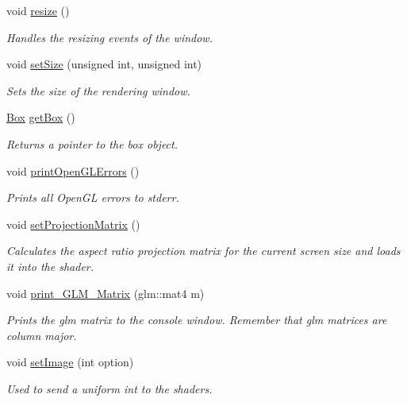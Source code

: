 \begin{DoxyCompactItemize}
void \hyperlink{class_graphics_engine_a6a38e40ee4227a8b53dddf07f92323ee}{resize} ()
\begin{DoxyCompactList}\small\item\em Handles the resizing events of the window. \end{DoxyCompactList}\item 
void \hyperlink{class_graphics_engine_aac1a9cc3d195ed1f28018dffd80dae41}{set\+Size} (unsigned int, unsigned int)
\begin{DoxyCompactList}\small\item\em Sets the size of the rendering window. \end{DoxyCompactList}\item 
\mbox{\label{class_graphics_engine_ad54e730c88430d0650dc695d08a33712}} 
\hyperlink{class_box}{Box} \hyperlink{class_graphics_engine_ad54e730c88430d0650dc695d08a33712}{get\+Box} ()
\begin{DoxyCompactList}\small\item\em Returns a pointer to the box object. \end{DoxyCompactList}\item 
\mbox{\label{class_graphics_engine_a9c4622979bc82bba99dfa25851d9d4cb}} 
void \hyperlink{class_graphics_engine_a9c4622979bc82bba99dfa25851d9d4cb}{print\+Open\+G\+L\+Errors} ()
\begin{DoxyCompactList}\small\item\em Prints all Open\+GL errors to stderr. \end{DoxyCompactList}\item 
void \hyperlink{class_graphics_engine_ad08e9c3cefa14b160d478520b3f9b376}{set\+Projection\+Matrix} ()
\begin{DoxyCompactList}\small\item\em Calculates the aspect ratio projection matrix for the current screen size and loads it into the shader. \end{DoxyCompactList}\item 
void \hyperlink{class_graphics_engine_a06253e3976fa7b6436f58ec3f472de15}{print\+\_\+\+G\+L\+M\+\_\+\+Matrix} (glm\+::mat4 m)
\begin{DoxyCompactList}\small\item\em Prints the glm matrix to the console window. Remember that glm matrices are column major. \end{DoxyCompactList}\item 
void \hyperlink{class_graphics_engine_a865593938e62d6de6a229be7fc4a971a}{set\+Image} (int option)
\begin{DoxyCompactList}\small\item\em Used to send a uniform int to the shaders. \end{DoxyCompactList}\end{DoxyCompactItemize}



